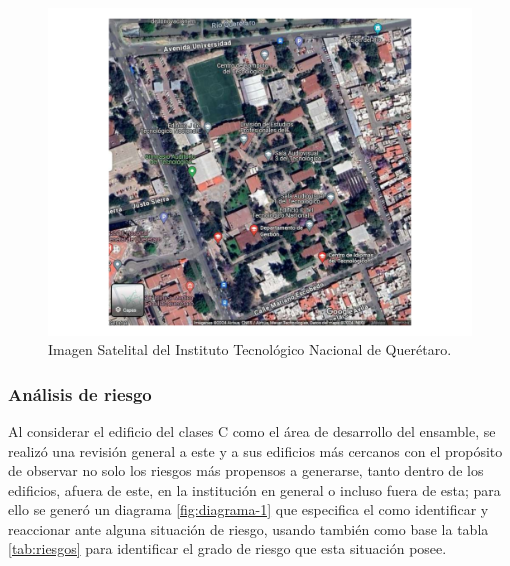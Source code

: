     \begin{figure}[H]
    \centering
    \includegraphics[scale=0.32]{19/Img/mapaITQ2.pdf}
    \caption{Imagen Satelital del Instituto Tecnológico Nacional de Querétaro.}
    \label{fig:mapaITQ-2}
\end{figure}

 \subsubsection{Análisis de riesgo}

 Al considerar el edificio del clases C como el área de desarrollo del ensamble, se realizó una revisión general a este y a sus edificios más cercanos con el propósito de observar no solo los riesgos más propensos a generarse, tanto dentro de los edificios, afuera de este, en la institución en general o incluso fuera de esta; para ello se generó un diagrama \ref{fig:diagrama-1} que especifica el como identificar y reaccionar ante alguna situación de riesgo, usando también como base la tabla \ref{tab:riesgos} para identificar el grado de riesgo que esta situación posee.

